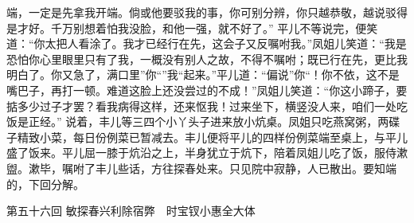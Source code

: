 \documentclass[12pt,oneside]{book}
\begin{document}
端，一定是先拿我开端。倘或他要驳我的事，你可别分辨，你只越恭敬，越说驳得是才好。千万别想着怕我没脸，和他一强，就不好了。”
平儿不等说完，便笑道：“你太把人看涂了。我才已经行在先，这会子又反嘱咐我。”凤姐儿笑道：“我是恐怕你心里眼里只有了我，一概没有别人之故，不得不嘱咐；既已行在先，更比我明白了。你又急了，满口里”你“”我“起来。”平儿道：“偏说”你“！你不依，这不是嘴巴子，再打一顿。难道这脸上还没尝过的不成！”凤姐儿笑道：“你这小蹄子，要掂多少过子才罢？看我病得这样，还来怄我！过来坐下，横竖没人来，咱们一处吃饭是正经。”
说着，丰儿等三四个小丫头子进来放小炕桌。凤姐只吃燕窝粥，两碟子精致小菜，每日份例菜已暂减去。丰儿便将平儿的四样份例菜端至桌上，与平儿盛了饭来。平儿屈一膝于炕沿之上，半身犹立于炕下，陪着凤姐儿吃了饭，服侍漱盥。漱毕，嘱咐了丰儿些话，方往探春处来。只见院中寂静，人已散出。要知端的，下回分解。
 
第五十六回  敏探春兴利除宿弊　时宝钗小惠全大体
\end{document}
